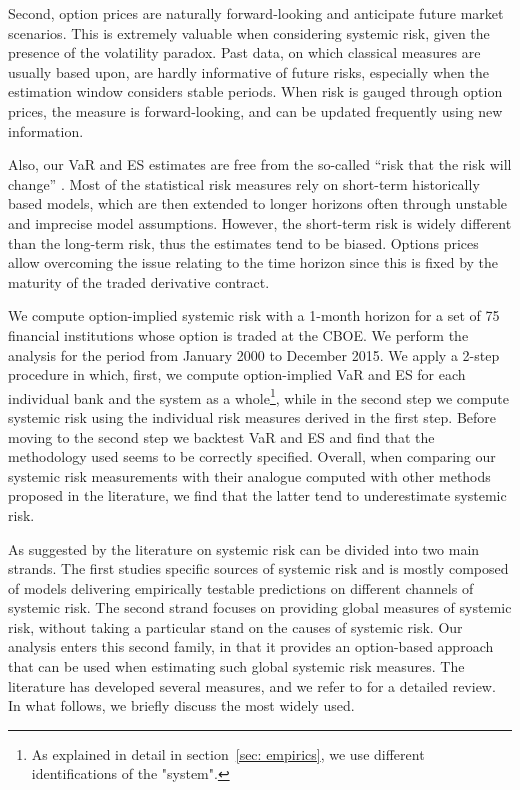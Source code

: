 \documentclass[11pt,a4paper,english]{article}
\begin{document}
Second, option prices are naturally forward-looking and anticipate future market scenarios. This is extremely valuable when considering systemic risk, given the presence of the volatility paradox. Past data, on which classical measures are usually based upon, are hardly informative of future risks, especially when the estimation window considers stable periods. When risk is gauged through option prices, the measure is forward-looking, and can be updated frequently using new information.

Also, our VaR and ES estimates are free from the so-called “risk that the risk will change” \citep{Engle2009, Engle2011, Brownlees2011}. Most of the statistical risk measures rely on short-term historically based models, which are then extended to longer horizons often through unstable and imprecise model assumptions. However, the short-term risk is widely different than the long-term risk, thus the estimates tend to be biased. Options prices allow overcoming the issue relating to the time horizon since this is fixed by the maturity of the traded derivative contract. 

We compute option-implied systemic risk with a 1-month horizon for a set of 75 financial institutions whose option is traded at the CBOE. We perform the analysis for the period from January 2000 to December 2015. We apply a 2-step procedure in which, first, we compute option-implied VaR and ES for each individual bank and the system as a whole\footnote{As explained in detail in section~\ref{sec: empirics}, we use different identifications of the "system".}, while in the second step we compute systemic risk using the individual risk measures derived in the first step. Before moving to the second step we backtest VaR and ES and find that the methodology used seems to be correctly specified. Overall, when comparing our systemic risk measurements with their analogue computed with other methods proposed in the literature, we find that the latter tend to underestimate systemic risk.  

As suggested by \citet{Benoit2016} the literature on systemic risk can be divided into two main strands. The first studies specific sources of systemic risk and is mostly composed of models delivering empirically testable predictions on different channels of systemic risk. The second strand focuses on providing global measures of systemic risk, without taking a particular stand on the causes of systemic risk. Our analysis enters this second family, in that it provides an option-based approach that can be used when estimating such global systemic risk measures. The literature has developed several measures, and we refer to \citet{Benoit2016} for a detailed review. In what follows, we briefly discuss the most widely used. 
\end{document}
